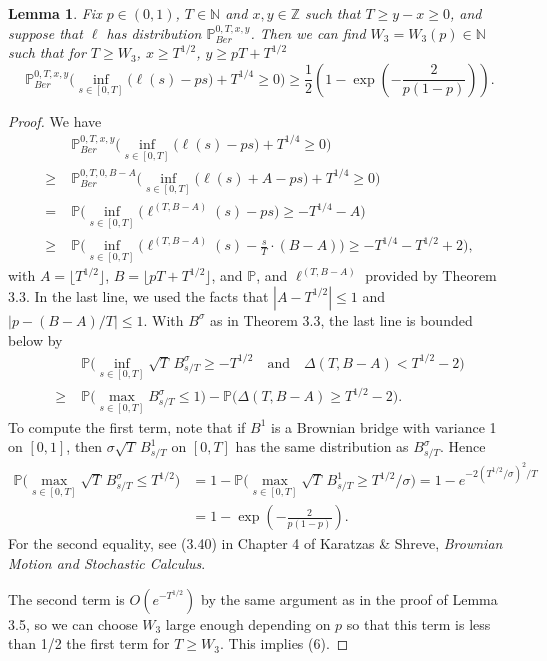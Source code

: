 \documentclass[12pt]{article}
\newtheorem{lemma}{Lemma}
\begin{document}
	\begin{lemma}\label{LemmaAwayS4} Fix $p \in (0,1)$, $T \in \mathbb{N}$ and $x, y\in \mathbb{Z}$ such that $T \geq y-x \geq 0$, and suppose that $\ell$ has distribution $\mathbb{P}^{0,T,x,y}_{Ber}$. Then we can find $W_3 = W_3(p) \in \mathbb{N}$ such that for $T \geq W_3$, $ x \geq T^{1/2}$, $ y \geq pT +  T^{1/2}$
		\begin{equation}\label{awayS4}
		\mathbb{P}^{0,T,x,y}_{Ber}\Big( \inf_{s \in [0,T]} \big( \ell(s) -ps \big)+ T^{1/4} \geq 0 \Big) \geq \frac{1}{2} \left(1 - \exp\left(-\frac{2}{p(1-p)}\right)\right).
		\end{equation}
	\end{lemma}
	
	\begin{proof}
		
		We have
		\begin{align*}
		& \mathbb{P}^{0,T,x,y}_{Ber}\Big( \inf_{s \in [0,T]} \big( \ell(s) -ps \big)+ T^{1/4} \geq 0 \Big) \\
		\geq \; & \mathbb{P}^{0,T,0,B-A}_{Ber}\Big( \inf_{s \in [0,T]} \big( \ell(s) + A -ps \big)+ T^{1/4} \geq 0 \Big)\\
		= \; & \mathbb{P}\Big( \inf_{s \in [0,T]} \big( \ell^{(T,B-A)}(s) -ps \big) \geq - T^{1/4} - A \Big)\\
		\geq \; & \mathbb{P}\Big( \inf_{s \in [0,T]} \big( \ell^{(T,B-A)}(s) - \frac{s}{T}\cdot(B-A) \big) \geq - T^{1/4} - T^{1/2} + 2 \Big),
		\end{align*}
		with $A = \lfloor T^{1/2}\rfloor$, $B = \lfloor pT + T^{1/2}\rfloor$, and $\mathbb{P}$, and $\ell^{(T,B-A)}$ provided by Theorem 3.3. In the last line, we used the facts that $|A-T^{1/2}|\leq 1$ and $|p-(B-A)/T|\leq 1$. With $B^\sigma$ as in Theorem 3.3, the last line is bounded below by
		\begin{align*}
		&\mathbb{P}\Big( \inf_{s\in[0,T]} \sqrt{T}\,B^\sigma_{s/T} \geq - T^{1/2} \quad \mathrm{and} \quad \Delta(T,B-A) < T^{1/2} - 2 \Big)\\
		\geq \; & \mathbb{P}\Big( \max_{s\in[0,T]} B^\sigma_{s/T} \leq 1 \Big) - \mathbb{P}\Big( \Delta(T,B-A) \geq T^{1/2} - 2 \Big).
		\end{align*}
		To compute the first term, note that if $B^1$ is a Brownian bridge with variance 1 on $[0,1]$, then $\sigma \sqrt{T}\,B^1_{s/T}$ on $[0,T]$ has the same distribution as $B^\sigma_{s/T}$. Hence
		\begin{align*}
		\mathbb{P}\Big( \max_{s\in[0,T]} \sqrt{T}\,B^\sigma_{s/T} \leq T^{1/2} \Big) &= 1 - \mathbb{P}\Big( \max_{s\in[0,T]} \sqrt{T}\,B^1_{s/T} \geq T^{1/2}/\sigma \Big) = 1 - e^{-2(T^{1/2}/\sigma)^2/T}\\ 
		&= 1- \exp\left(-\frac{2}{p(1-p)}\right).
		\end{align*}
		For the second equality, see (3.40) in Chapter 4 of Karatzas \& Shreve, \textit{Brownian Motion and Stochastic Calculus}.
		
		The second term is $O(e^{-T^{1/2}})$ by the same argument as in the proof of Lemma 3.5, so we can choose $W_3$ large enough depending on $p$ so that this term is less than 1/2 the first term for $T\geq W_3$. This implies (6).
		
		
	\end{proof}
\end{document}
